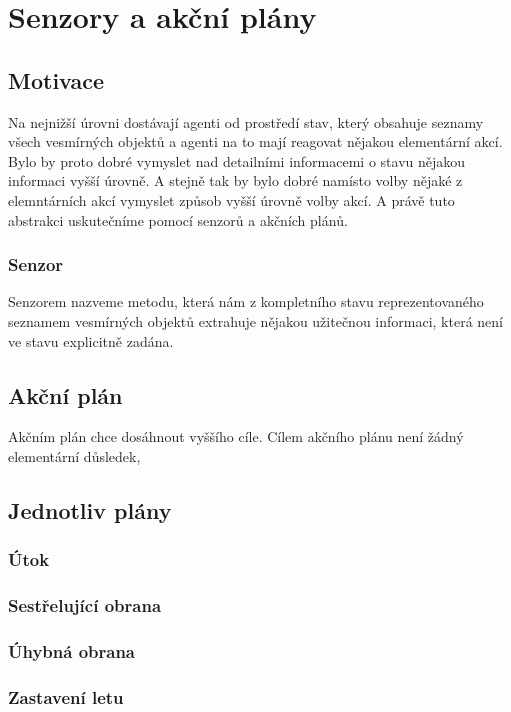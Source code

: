 \chapter{Senzory a akční plány}

\section{Motivace}
Na nejnižší úrovni dostávají agenti od prostředí stav, který obsahuje seznamy všech vesmírných objektů a agenti na to mají reagovat nějakou elementární akcí.
Bylo by proto dobré vymyslet nad detailními informacemi o stavu nějakou informaci vyšší úrovně. A stejně tak by bylo dobré namísto volby nějaké z elemntárních akcí vymyslet způsob vyšší úrovně volby akcí.
A právě tuto abstrakci uskutečníme pomocí senzorů a akčních plánů.
\subsection{Senzor}

Senzorem nazveme metodu, která nám z kompletního stavu reprezentovaného seznamem vesmírných objektů extrahuje nějakou užitečnou informaci, která není ve stavu explicitně zadána.
\section{Akční plán}
Akčním plán chce dosáhnout vyššího cíle. Cílem akčního plánu není žádný elementární důsledek, 

\section{Jednotliv plány}
\subsection{Útok}
\subsection{Sestřelující obrana}
\subsection{Úhybná obrana}
\subsection{Zastavení letu}




